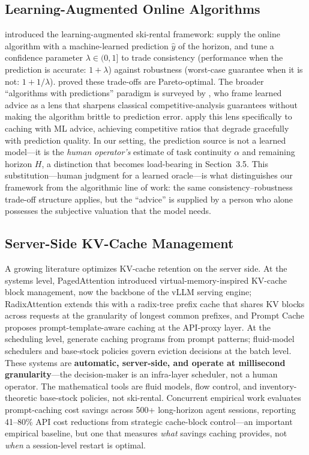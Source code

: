 \documentclass[11pt]{article}
\theoremstyle{definition}
\theoremstyle{remark}
\begin{document}
\subsection{Learning-Augmented Online Algorithms}

\citet{purohit2018} introduced the learning-augmented ski-rental framework: supply the online algorithm with a machine-learned prediction $\hat{y}$ of the horizon, and tune a confidence parameter $\lambda \in (0,1]$ to trade consistency (performance when the prediction is accurate: $1+\lambda$) against robustness (worst-case guarantee when it is not: $1+1/\lambda$). \citet{wei2020} proved these trade-offs are Pareto-optimal. The broader ``algorithms with predictions'' paradigm is surveyed by \citet{mitzenmacher2022}, who frame learned advice as a lens that sharpens classical competitive-analysis guarantees without making the algorithm brittle to prediction error. \citet{lykouris2021} apply this lens specifically to caching with ML advice, achieving competitive ratios that degrade gracefully with prediction quality. In our setting, the prediction source is not a learned model---it is the \emph{human operator's} estimate of task continuity $\alpha$ and remaining horizon $H$, a distinction that becomes load-bearing in Section~3.5. This substitution---human judgment for a learned oracle---is what distinguishes our framework from the algorithmic line of work: the same consistency--robustness trade-off structure applies, but the ``advice'' is supplied by a person who alone possesses the subjective valuation that the model needs.

\subsection{Server-Side KV-Cache Management}

A growing literature optimizes KV-cache retention on the server side. At the systems level, PagedAttention \citep{kwon2023} introduced virtual-memory-inspired KV-cache block management, now the backbone of the vLLM serving engine; RadixAttention \citep{zheng2024} extends this with a radix-tree prefix cache that shares KV blocks across requests at the granularity of longest common prefixes, and Prompt Cache \citep{gim2024} proposes prompt-template-aware caching at the API-proxy layer. At the scheduling level, \citet{gencache2025} generate caching programs from prompt patterns; fluid-model schedulers \citep{fluid2025} and base-stock policies govern eviction decisions at the batch level. These systems are \textbf{automatic, server-side, and operate at millisecond granularity}---the decision-maker is an infra-layer scheduler, not a human operator. The mathematical tools are fluid models, flow control, and inventory-theoretic base-stock policies, not ski-rental. Concurrent empirical work \citep{lumer2026} evaluates prompt-caching cost savings across 500+ long-horizon agent sessions, reporting 41--80\% API cost reductions from strategic cache-block control---an important empirical baseline, but one that measures \emph{what} savings caching provides, not \emph{when} a session-level restart is optimal.
\end{document}
